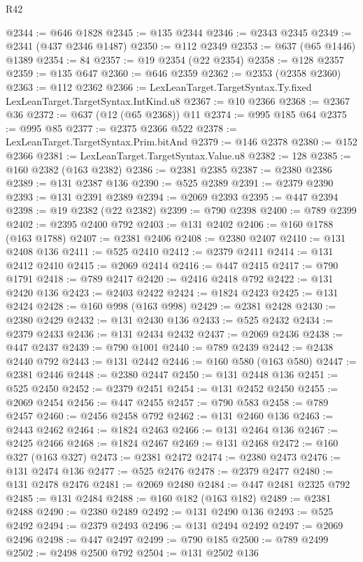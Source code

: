 \begin{lexlean}{R42}
\begin{coremodule}
@2344 := @646 @1828
@2345 := @135 @2344
@2346 := @2343 @2345
@2349 := @2341 (@437 @2346 @1487)
@2350 := @112 @2349
@2353 := @637 (@65 @1446) @1389
@2354 := 84
@2357 := @19 @2354 (@22 @2354)
@2358 := @128 @2357
@2359 := @135 @647
@2360 := @646 @2359
@2362 := @2353 (@2358 @2360)
@2363 := @112 @2362
@2366 := LexLeanTarget.TargetSyntax.Ty.fixed LexLeanTarget.TargetSyntax.IntKind.u8
@2367 := @10 @2366
@2368 := @2367 @36
@2372 := @637 (@12 (@65 @2368)) @11
@2374 := @995 @185 @64
@2375 := @995 @85
@2377 := @2375 @2366 @522
@2378 := LexLeanTarget.TargetSyntax.Prim.bitAnd
@2379 := @146 @2378
@2380 := @152 @2366
@2381 := LexLeanTarget.TargetSyntax.Value.u8
@2382 := 128
@2385 := @160 @2382 (@163 @2382)
@2386 := @2381 @2385
@2387 := @2380 @2386
@2389 := @131 @2387 @136
@2390 := @525 @2389
@2391 := @2379 @2390
@2393 := @131 @2391 @2389
@2394 := @2069 @2393
@2395 := @447 @2394
@2398 := @19 @2382 (@22 @2382)
@2399 := @790 @2398
@2400 := @789 @2399
@2402 := @2395 @2400 @792
@2403 := @131 @2402
@2406 := @160 @1788 (@163 @1788)
@2407 := @2381 @2406
@2408 := @2380 @2407
@2410 := @131 @2408 @136
@2411 := @525 @2410
@2412 := @2379 @2411
@2414 := @131 @2412 @2410
@2415 := @2069 @2414
@2416 := @447 @2415
@2417 := @790 @1791
@2418 := @789 @2417
@2420 := @2416 @2418 @792
@2422 := @131 @2420 @136
@2423 := @2403 @2422
@2424 := @1824 @2423
@2425 := @131 @2424
@2428 := @160 @998 (@163 @998)
@2429 := @2381 @2428
@2430 := @2380 @2429
@2432 := @131 @2430 @136
@2433 := @525 @2432
@2434 := @2379 @2433
@2436 := @131 @2434 @2432
@2437 := @2069 @2436
@2438 := @447 @2437
@2439 := @790 @1001
@2440 := @789 @2439
@2442 := @2438 @2440 @792
@2443 := @131 @2442
@2446 := @160 @580 (@163 @580)
@2447 := @2381 @2446
@2448 := @2380 @2447
@2450 := @131 @2448 @136
@2451 := @525 @2450
@2452 := @2379 @2451
@2454 := @131 @2452 @2450
@2455 := @2069 @2454
@2456 := @447 @2455
@2457 := @790 @583
@2458 := @789 @2457
@2460 := @2456 @2458 @792
@2462 := @131 @2460 @136
@2463 := @2443 @2462
@2464 := @1824 @2463
@2466 := @131 @2464 @136
@2467 := @2425 @2466
@2468 := @1824 @2467
@2469 := @131 @2468
@2472 := @160 @327 (@163 @327)
@2473 := @2381 @2472
@2474 := @2380 @2473
@2476 := @131 @2474 @136
@2477 := @525 @2476
@2478 := @2379 @2477
@2480 := @131 @2478 @2476
@2481 := @2069 @2480
@2484 := @447 @2481 @2325 @792
@2485 := @131 @2484
@2488 := @160 @182 (@163 @182)
@2489 := @2381 @2488
@2490 := @2380 @2489
@2492 := @131 @2490 @136
@2493 := @525 @2492
@2494 := @2379 @2493
@2496 := @131 @2494 @2492
@2497 := @2069 @2496
@2498 := @447 @2497
@2499 := @790 @185
@2500 := @789 @2499
@2502 := @2498 @2500 @792
@2504 := @131 @2502 @136

\end{coremodule}
\end{lexlean}
